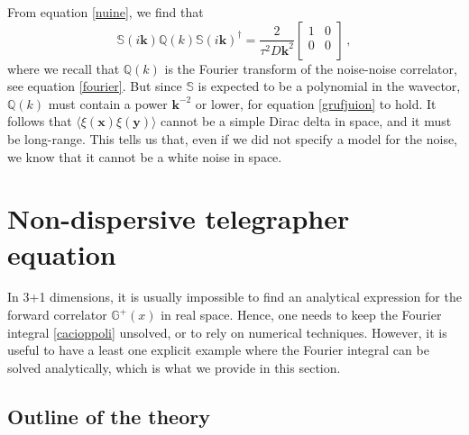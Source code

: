 \documentclass[a4paper, amsfonts, amssymb, amsmath, reprint, showkeys, nofootinbib, twoside,notitlepage,onecolumn]{revtex4-2}
\newcommand{\Sa}{{\mathbb{S}}}
\newcommand{\Ga}{{\mathbb{G}}}
\newcommand{\Qa}{{\mathbb{Q}}}
\newcommand{\x}{{\textbf{x}}}
\newcommand{\y}{{\textbf{y}}}
\newcommand{\kb}{{\textbf{k}}}
\theoremstyle{definition}
\begin{document}
From equation \eqref{nuine}, we find that 
\begin{equation}\label{grufjuion}
   \Sa(i\kb) \Qa(k) \Sa(i\kb)^\dagger= \dfrac{2}{\tau^2 D \kb^2} 
    \begin{bmatrix}
        1 & 0 \\
        0 &  0 \\
    \end{bmatrix} \, ,
\end{equation}
where we recall that $\Qa(k)$ is the Fourier transform of the noise-noise correlator, see equation \eqref{fourier}. But since $\Sa$ is expected to be a polynomial in the wavector, $\Qa(k)$ must contain a power $\kb^{-2}$ or lower, for equation \eqref{grufjuion} to hold. It follows that $\langle \xi(\x)\xi(\y) \rangle$ cannot be a simple Dirac delta in space, and it must be long-range. This tells us that, even if we did not specify a model for the noise, we know that it cannot be a white noise in space.


\section{Non-dispersive telegrapher equation}

In 3+1 dimensions, it is usually impossible to find an analytical expression for the forward correlator $\Ga^+(x)$ in real space. Hence, one needs to keep the Fourier integral \eqref{cacioppoli} unsolved, or to rely on numerical techniques. However, it is useful to have a least one explicit example where the Fourier integral can be solved analytically, which is what we provide in this section.

\subsection{Outline of the theory}
\end{document}
